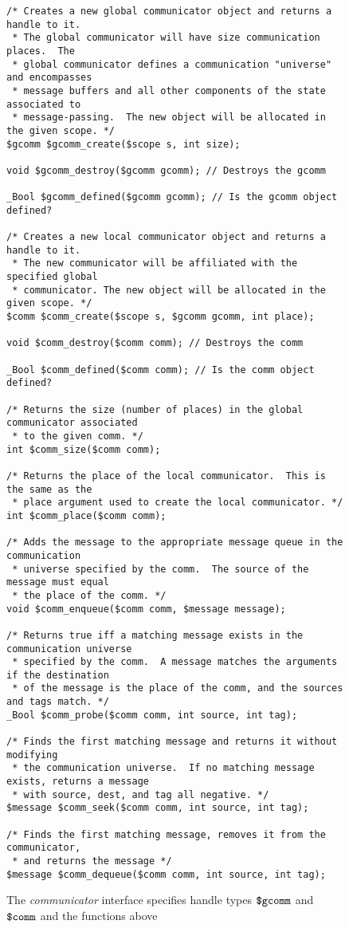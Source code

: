 \begin{figure}
  \begin{small}
\begin{verbatim}
/* Creates a new global communicator object and returns a handle to it.
 * The global communicator will have size communication places.  The
 * global communicator defines a communication "universe" and encompasses
 * message buffers and all other components of the state associated to
 * message-passing.  The new object will be allocated in the given scope. */
$gcomm $gcomm_create($scope s, int size);

void $gcomm_destroy($gcomm gcomm); // Destroys the gcomm

_Bool $gcomm_defined($gcomm gcomm); // Is the gcomm object defined?

/* Creates a new local communicator object and returns a handle to it.
 * The new communicator will be affiliated with the specified global
 * communicator. The new object will be allocated in the given scope. */
$comm $comm_create($scope s, $gcomm gcomm, int place);

void $comm_destroy($comm comm); // Destroys the comm

_Bool $comm_defined($comm comm); // Is the comm object defined?

/* Returns the size (number of places) in the global communicator associated
 * to the given comm. */
int $comm_size($comm comm);

/* Returns the place of the local communicator.  This is the same as the
 * place argument used to create the local communicator. */
int $comm_place($comm comm);

/* Adds the message to the appropriate message queue in the communication
 * universe specified by the comm.  The source of the message must equal
 * the place of the comm. */
void $comm_enqueue($comm comm, $message message);

/* Returns true iff a matching message exists in the communication universe
 * specified by the comm.  A message matches the arguments if the destination
 * of the message is the place of the comm, and the sources and tags match. */
_Bool $comm_probe($comm comm, int source, int tag);

/* Finds the first matching message and returns it without modifying
 * the communication universe.  If no matching message exists, returns a message
 * with source, dest, and tag all negative. */
$message $comm_seek($comm comm, int source, int tag);

/* Finds the first matching message, removes it from the communicator,
 * and returns the message */ 
$message $comm_dequeue($comm comm, int source, int tag);
\end{verbatim}
  \end{small}
  \caption{The \emph{communicator} interface specifies handle 
    types $\mbox{\texttt{\${}gcomm}}$ and $\mbox{\texttt{\${}comm}}$ and the functions above}
  \label{fig:comm}
\end{figure}

